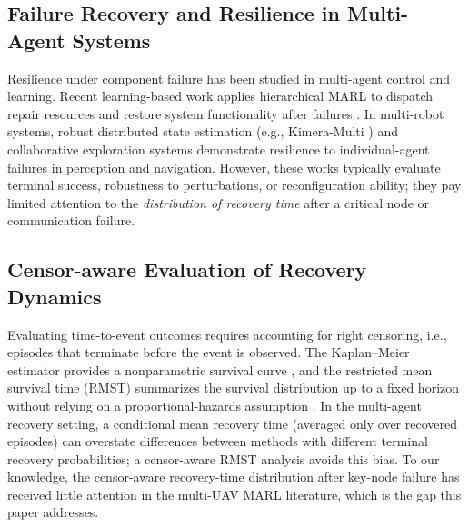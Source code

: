 \subsection{Failure Recovery and Resilience in Multi-Agent Systems}

Resilience under component failure has been studied in multi-agent control and learning. Recent learning-based work applies hierarchical MARL to dispatch repair resources and restore system functionality after failures \cite{qiu2023resilience}. In multi-robot systems, robust distributed state estimation (e.g., Kimera-Multi \cite{tian2022kimeramulti}) and collaborative exploration systems \cite{zhou2023racer} demonstrate resilience to individual-agent failures in perception and navigation. However, these works typically evaluate terminal success, robustness to perturbations, or reconfiguration ability; they pay limited attention to the \emph{distribution of recovery time} after a critical node or communication failure.

\subsection{Censor-aware Evaluation of Recovery Dynamics}

Evaluating time-to-event outcomes requires accounting for right censoring, i.e., episodes that terminate before the event is observed. The Kaplan--Meier estimator provides a nonparametric survival curve \cite{kaplan1958}, and the restricted mean survival time (RMST) summarizes the survival distribution up to a fixed horizon without relying on a proportional-hazards assumption \cite{royston2011rmst, uno2014rmst}. In the multi-agent recovery setting, a conditional mean recovery time (averaged only over recovered episodes) can overstate differences between methods with different terminal recovery probabilities; a censor-aware RMST analysis avoids this bias. To our knowledge, the censor-aware recovery-time distribution after key-node failure has received little attention in the multi-UAV MARL literature, which is the gap this paper addresses.
